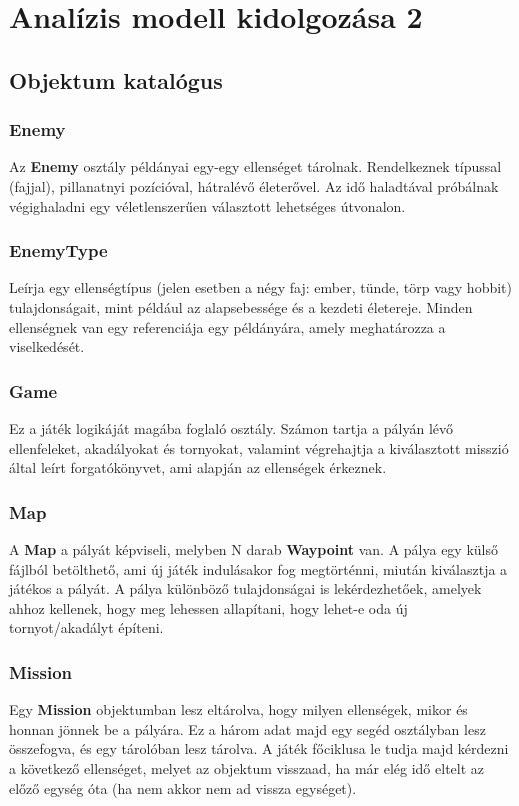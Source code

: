 %
\chapter{Analízis modell kidolgozása 2}

\thispagestyle{fancy}

\section{Objektum katalógus}

\subsection{Enemy}
Az \textbf{Enemy} osztály példányai egy-egy ellenséget tárolnak. Rendelkeznek típussal (fajjal), pillanatnyi pozícióval, hátralévő életerővel. Az idő haladtával próbálnak végighaladni egy véletlenszerűen választott lehetséges útvonalon.

\subsection{EnemyType}
Leírja egy ellenségtípus (jelen esetben a négy faj: ember, tünde, törp vagy hobbit) tulajdonságait, mint például az alapsebessége és a kezdeti életereje. Minden ellenségnek van egy referenciája egy példányára, amely meghatározza a viselkedését.

\subsection{Game}
Ez a játék logikáját magába foglaló osztály. Számon tartja a pályán lévő ellenfeleket, akadályokat és tornyokat, valamint végrehajtja a kiválasztott misszió által leírt forgatókönyvet, ami alapján az ellenségek érkeznek.

\subsection{Map}
A \textbf{Map} a pályát képviseli, melyben N darab \textbf{Waypoint} van. A pálya egy külső fájlból betölthető, ami új játék indulásakor fog megtörténni, miután kiválasztja a játékos a pályát. A pálya különböző tulajdonságai is lekérdezhetőek, amelyek ahhoz kellenek, hogy meg lehessen allapítani, hogy lehet-e oda új tornyot/akadályt építeni.

\subsection{Mission}
Egy \textbf{Mission} objektumban lesz eltárolva, hogy milyen ellenségek, mikor és honnan jönnek be a pályára. Ez a három adat majd egy segéd osztályban lesz összefogva, és egy tárolóban lesz tárolva. A játék főciklusa le tudja majd kérdezni a következő ellenséget, melyet az objektum visszaad, ha már elég idő eltelt az előző egység óta (ha nem akkor nem ad vissza egységet).

